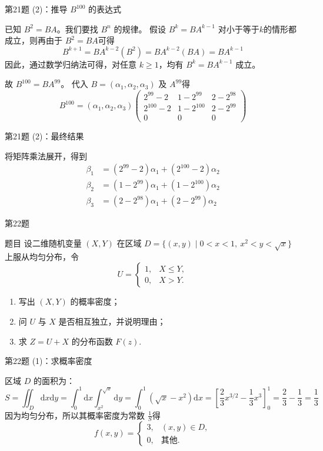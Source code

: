 \documentclass[aspectratio=169]{beamer}
\begin{document}
\begin{frame}{第21题 (2)：推导 \(B^{100}\) 的表达式}
\begin{block}{}
已知 \(B^2 = BA\)。我们要找 \(B^n\) 的规律。
假设 \(B^k = B A^{k-1}\) 对小于等于\(k\)的情形都成立，则再由于 \(B^2 = BA\)可得
\[
B^{k+1} = B A^{k-2} (B^2) = B A^{k-2} (BA) = B A^{k-1}
\]
因此，通过数学归纳法可得，对任意 \(k \ge 1\)，均有 \(B^k = B A^{k-1}\) 成立。

故 \(B^{100} = B A^{99}\)。
代入 \(B=(\alpha_1,\alpha_2,\alpha_3)\) 及 \(A^{99}\)得
\[
B^{100} = (\alpha_1,\alpha_2,\alpha_3) \begin{pmatrix} 2^{99}-2 & 1-2^{99} & 2-2^{98} \\ 2^{100}-2 & 1-2^{100} & 2-2^{99} \\ 0 & 0 & 0 \end{pmatrix}
\]
\end{block}
\end{frame}

\begin{frame}{第21题 (2)：最终结果}
\begin{block}{}
将矩阵乘法展开，得到
\begin{align*}
\beta_1 &= (2^{99}-2)\alpha_1 + (2^{100}-2)\alpha_2 \\
\beta_2 &= (1-2^{99})\alpha_1 + (1-2^{100})\alpha_2 \\
\beta_3 &= (2-2^{98})\alpha_1 + (2-2^{99})\alpha_2
\end{align*}
\end{block}
\end{frame}

\begin{frame}{第22题}
\begin{block}{题目}
设二维随机变量 \((X, Y)\) 在区域 \(D=\{(x, y) \mid 0<x<1,\ x^{2}<y<\sqrt{x}\}\) 上服从均匀分布，令
\[U=\begin{cases} 1, & X \leqslant Y, \\ 0, & X>Y. \end{cases}\]
\begin{enumerate}[(1)]
\item 写出 \((X, Y)\) 的概率密度；
\item 问 \(U\) 与 \(X\) 是否相互独立，并说明理由；
\item 求 \(Z=U+X\) 的分布函数 \(F(z)\).
\end{enumerate}
\end{block}
\end{frame}

\begin{frame}{第22题 (1)：求概率密度}
\begin{block}{}
区域 \(D\) 的面积为：
\[
S = \iint_D \mathrm{d}x\mathrm{d}y = \int_{0}^{1} \mathrm{d}x \int_{x^2}^{\sqrt{x}} \mathrm{d}y = \int_{0}^{1} (\sqrt{x} - x^2) \mathrm{d}x = \left[ \frac{2}{3} x^{3/2} - \frac{1}{3} x^3 \right]_{0}^{1} = \frac{2}{3} - \frac{1}{3} = \frac{1}{3}
\]
因为均匀分布，所以其概率密度为常数 \(\frac{1}{S}\)得
\[
f(x,y) = \begin{cases} 3, & (x,y) \in D, \\ 0, & \text{其他}. \end{cases}
\]
\end{block}
\end{frame}
\end{document}
